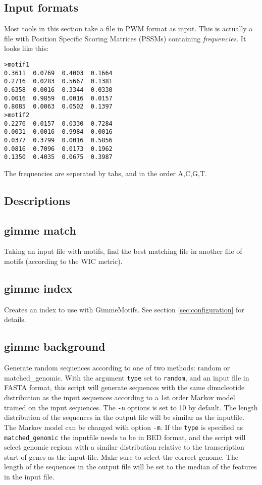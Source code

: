\documentclass[11pt]{article}
\begin{document}
\subsection{Input formats}
Most tools in this section take a file in PWM format as input. This is actually a file with Position Specific Scoring Matrices (PSSMs) containing \emph{frequencies}. It looks like this:
\begin{verbatim}
>motif1
0.3611	0.0769	0.4003	0.1664
0.2716	0.0283	0.5667	0.1381
0.6358	0.0016	0.3344	0.0330
0.0016	0.9859	0.0016	0.0157
0.8085	0.0063	0.0502	0.1397
>motif2
0.2276	0.0157	0.0330	0.7284
0.0031	0.0016	0.9984	0.0016
0.0377	0.3799	0.0016	0.5856
0.0816	0.7096	0.0173	0.1962
0.1350	0.4035	0.0675	0.3987
\end{verbatim}
The frequencies are seperated by tabs, and in the order A,C,G,T.

\subsection{Descriptions}
\subsection*{gimme match}
Taking an input file with motifs, find the best matching file in another file of motifs (according to the WIC metric).

\subsection*{gimme index}
Creates an index to use with GimmeMotifs. See section \ref{sec:configuration} for details.

\subsection*{gimme background}
Generate random sequences according to one of two methods: random or matched\_genomic. With the argument \texttt{type} set to \texttt{random}, and an input file in FASTA format, this script will generate sequences with the same dinucleotide distribution as the input sequences according to a 1st order Markov model trained on the input sequences. The \texttt{-n} options is set to 10 by default. The length distribution of the sequences in the output file will be similar as the inputfile. The Markov model can be changed with option \texttt{-m}.
If the \texttt{type} is specified as \texttt{matched\_genomic} the inputfile needs to be in BED format, and the script will select genomic regions with a similar distribution relative to the transcription start of genes as the input file. Make sure to select the correct genome. The length of the sequences in the output file will be set to the median of the features in the input file.
\end{document}
